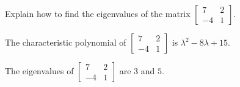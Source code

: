 
\begin{exerciseStatement}


Explain how to find the eigenvalues of the matrix \( \left[\begin{array}{cc}
7 & 2 \\
-4 & 1
\end{array}\right] \).


\end{exerciseStatement}
    
\begin{exerciseAnswer} 


The characteristic polynomial of \( \left[\begin{array}{cc}
7 & 2 \\
-4 & 1
\end{array}\right] \) is \( \lambda^{2} - 8 \lambda + 15 \).



The eigenvalues of \( \left[\begin{array}{cc}
7 & 2 \\
-4 & 1
\end{array}\right] \) are \( 3 \) and \( 5 \).


\end{exerciseAnswer}
    
